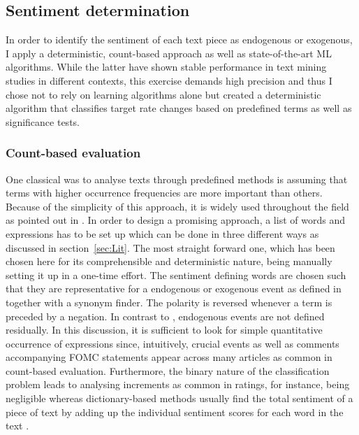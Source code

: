 %
\subsection{Sentiment determination}

In order to identify the sentiment of each text piece as endogenous or exogenous, I apply a deterministic, count-based approach as well as state-of-the-art ML algorithms. While the latter have shown stable performance in text mining studies in different contexts, this exercise demands high precision and thus I chose not to rely on learning algorithms alone but created a deterministic algorithm that classifies target rate changes based on predefined terms as well as significance tests.

%
\subsubsection{Count-based evaluation}

One classical was to analyse texts through predefined methods is assuming that terms with higher occurrence frequencies are more important than others. Because of the simplicity of this approach, it is widely used throughout the field as pointed out in \textcite{Meyer2008}. In order to design a promising approach, a list of words and expressions has to be set up which can be done in three different ways as discussed in section~\ref{sec:Lit}. The most straight forward one, which has been chosen here for its comprehensible and deterministic nature, being manually setting it up in a one-time effort. The sentiment defining words are chosen such that they are representative for a endogenous or exogenous event as defined in \textcite{Ellingsen.2003} together with a synonym finder. The polarity is reversed whenever a term is preceded by a negation. In contrast to \textcite{Ellingsen.2003}, endogenous events are not defined residually.
In this discussion, it is sufficient to look for simple quantitative occurrence of expressions since, intuitively, crucial events as well as comments accompanying FOMC statements appear across many articles as common in count-based evaluation. Furthermore, the binary nature of the classification problem leads to analysing increments as common in ratings, for instance, being negligible whereas dictionary-based methods usually find the total sentiment of a piece of text by adding up the individual sentiment scores for each word in the text \parencite{Silge.2017}. 

